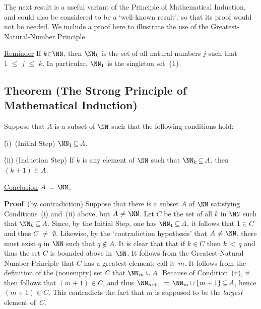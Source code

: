 \VV

        The next result is a useful variant of the Principle of Mathematical Induction, and could also be considered to be a `well-known result', so that its proof would not be needed.
    We include a proof here to illustrate the use of the Greatest-Natural-Number Principle.

\V

    \underline{Reminder} If $k{\in}{\NN}$, then ${\NN}_{k}$ is the set of all natural numbers $j$ such that $1\,\,{\leq}\,\,j\,\,{\leq}\,\,k$. In particular, ${\NN}_{1}$ is the singleton set~$\{1\}$.

\V

            \subsection{\small {\bf Theorem} (The Strong Principle of Mathematical Induction)}
            \label{ThmA20.04A}

        Suppose that $A$ is a subset of ${\NN}$ such that the following conditions hold:

        \h (i)\, (Initial Step) ${\NN}_{1} \,{\subseteq}\, A$.

        \h (ii) (Induction Step) If $k$ is any element of ${\NN}$ such that ${\NN}_{k} \,{\subseteq}\, A$, then $(k+1){\in}A$.

        \underline{Conclusion} $A \,=\, {\NN}$.

\V

        {\bf Proof}\, (by contradiction) Suppose that there is a subset $A$ of ${\NN}$ satisfying Conditions~(i) and~(ii) above,
    but $A \,\,{\neq}\,\, {\NN}$. Let $C$ be the set of all $k$ in ${\NN}$ such that ${\NN}_{k} \,{\subseteq}\, A$.
    Since, by the Initial Step, one has ${\NN}_{1} \,{\subseteq}\, A$, it follows that $1{\in}C$ and thus $C \,\,{\neq}\,\, {\emptyset}$.
    Likewise, by the `contradiction hypothesis' that $A \,\,{\neq}\,\, {\NN}$, there must exist $q$ in ${\NN}$ such that $q \not \in A$.
    It is clear that that if $k{\in}C$ then $k\,<\,q$ and thus the set $C$ is bounded above in~${\NN}$. It follows from the Greatest-Natural Number Principle that $C$ has a greatest element; call it~$m$.
    It follows from the definition of the (nonempty) set $C$ that ${\NN}_{m} \,{\subseteq}\, A$.
    Because of Condition~(ii), it then follows that $(m+1){\in}C$, and thus ${\NN}_{m+1} \,=\, {\NN}_{m}\,{\cup}\,\{m+1\} \,{\subseteq}\, A$, hence $(m+1){\in}C$.
    This contradicts the fact that $m$ is supposed to be the {\em largest} element of~$C$.

